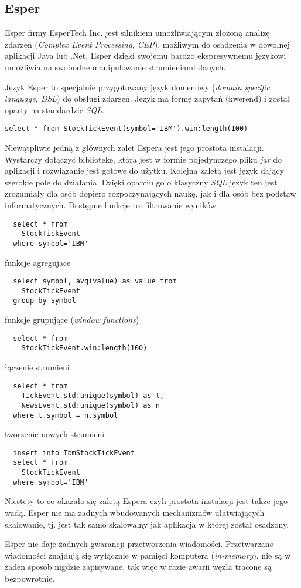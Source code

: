 \subsection{Esper}
Esper firmy EsperTech Inc. jest silnikiem umożliwiającym złożoną analizę zdarzeń
(\textit{Complex Event Processing, CEP}).
możliwym do osadzenia w dowolnej aplikacji Java lub .Net.
Esper dzięki swojemu bardzo ekspresywnemu językowi umożliwia na swobodne manipulowanie strumieniami danych.

Język Esper to specjalnie przygotowany język domenowy (\textit{domain specific language, DSL}) do obsługi zdarzeń.
Język ma formę zapytań (kwerend) i został oparty na standardzie \textit{SQL}.

\begin{lstlisting}[captionpos=b, caption=Przykładowe zapytanie w języku Esper]
  select * from StockTickEvent(symbol='IBM').win:length(100)
\end{lstlisting}

Niewątpliwie jedną z głównych zalet Espera jest jego prostota instalacji.
Wystarczy dołączyć bibliotekę,
która jest w formie pojedynczego pliku \textit{jar}
do aplikacji i rozwiązanie jest gotowe do użytku.
Kolejną zaletą jest język dający szerokie pole do działania.
Dzięki oparciu go o klasyczny \textit{SQL} język ten jest zrozumiały dla osób dopiero rozpoczynających naukę,
jak i dla osób bez podstaw informatycznych.
Dostępne funkcje to:
filtrowanie wyników
\begin{lstlisting}
  select * from
    StockTickEvent
  where symbol='IBM'
\end{lstlisting}
funkcje agregujace
\begin{lstlisting}
  select symbol, avg(value) as value from
    StockTickEvent
  group by symbol
\end{lstlisting}
funkcje grupujące (\textit{window functions})
\begin{lstlisting}
  select * from
    StockTickEvent.win:length(100)
\end{lstlisting}
łączenie strumieni
\begin{lstlisting}
  select * from
    TickEvent.std:unique(symbol) as t,
    NewsEvent.std:unique(symbol) as n
  where t.symbol = n.symbol
\end{lstlisting}
tworzenie nowych strumieni
\begin{lstlisting}
  insert into IbmStockTickEvent
  select * from
    StockTickEvent
  where symbol='IBM'
\end{lstlisting}

Niestety to co okazało się zaletą Espera czyli prostota instalacji
jest także jego wadą.
Esper nie ma żadnych wbudowanych mechanizmów ułatwiających skalowanie,
tj. jest tak samo skalowalny jak aplikacja w której został osadzony.

Esper nie daje żadnych gwarancji przetworzenia wiadomości.
Przetwarzane wiadomości znajdują się wyłącznie w pamięci komputera (\textit{in-memory}),
nie są w żaden sposób nigdzie zapisywane,
tak więc w razie awarii węzła tracone są bezpowrotnie.
